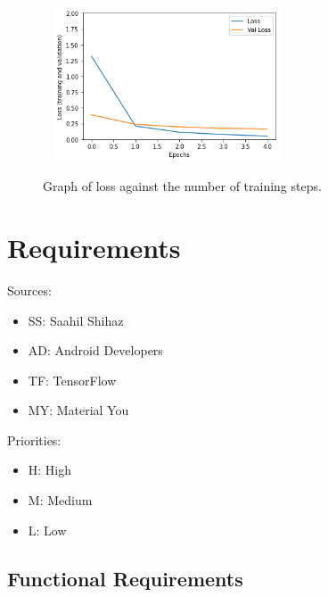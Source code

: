 \documentclass[12pt,a4paper]{report}
\begin{document}
\begin{figure}[h]\
    \centering
    \includegraphics[width=0.6\textwidth]{Loss.png}
    \caption{Graph of loss against the number of training steps.}
    \label{fig:incep_loss}
\end{figure}

\clearpage

\section{Requirements}

Sources:
\begin{itemize}
    \item SS: Saahil Shihaz
    \item AD: Android Developers
    \item TF: TensorFlow
    \item MY: Material You
\end{itemize}

Priorities:
\begin{itemize}
    \item H: High
    \item M: Medium
    \item L: Low
\end{itemize}

\subsection{Functional Requirements}
\label{subsec:funcreq}
\end{document}

